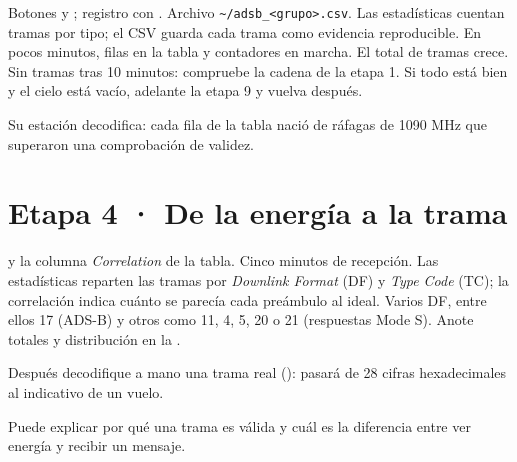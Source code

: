 {Botones  y ; registro con .}
{Archivo \texttt{\textasciitilde/adsb\_<grupo>.csv}.}
{Las estadísticas cuentan tramas por tipo; el CSV guarda cada trama como evidencia reproducible.}
{En pocos minutos, filas en la tabla y contadores en marcha.}
{El total de tramas crece.}
{Sin tramas tras 10 minutos: compruebe la cadena de la etapa 1. Si todo está bien y el cielo está vacío, adelante la etapa 9 y vuelva después.}

\begin{logro}
Su estación decodifica: cada fila de la tabla nació de ráfagas de 1090 MHz que superaron una comprobación de validez.
\end{logro}

\section{Etapa 4 · De la energía a la trama}
\label{sec:u-tramas}


{ y la columna \emph{Correlation} de la tabla.}
{Cinco minutos de recepción.}
{Las estadísticas reparten las tramas por \emph{Downlink Format} (DF) y \emph{Type Code} (TC); la correlación indica cuánto se parecía cada preámbulo al ideal.}
{Varios DF, entre ellos 17 (ADS-B) y otros como 11, 4, 5, 20 o 21 (respuestas Mode S).}
{Anote totales y distribución en la .}
{}

Después decodifique a mano una trama real (): pasará de 28 cifras hexadecimales al indicativo de un vuelo.


\begin{logro}
Puede explicar por qué una trama es válida y cuál es la diferencia entre ver energía y recibir un mensaje.
\end{logro}

